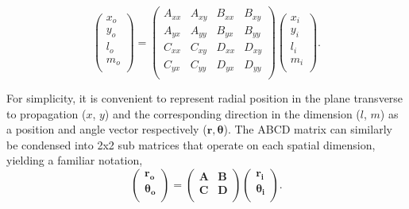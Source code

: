 \begin{equation}
    \begin{pmatrix}
    x_o \\
    y_o \\
    l_o \\
    m_o \\
    \end{pmatrix}
    = 
    \begin{pmatrix}
    A_{xx} & A_{xy} & B_{xx} & B_{xy} \\
    A_{yx} & A_{yy} & B_{yx} & B_{yy} \\
    C_{xx} & C_{xy} & D_{xx} & D_{xy} \\
    C_{yx} & C_{yy} & D_{yx} & D_{yy} \\
    \end{pmatrix}
    \begin{pmatrix}
    x_i \\
    y_i \\
    l_i \\
    m_i \\
    \end{pmatrix}.
    \label{eq:totalabcdmatrix}
\end{equation}

For simplicity, it is convenient to represent  radial position in the plane transverse to propagation ($x$, $y$) and the corresponding direction in the dimension ($l$, $m$) as a position and angle vector respectively ($\mathbf{r}, \boldsymbol{\theta}$). The ABCD matrix can similarly be condensed into 2x2 sub matrices that operate on each spatial dimension, yielding a familiar notation,
\begin{equation}
    \begin{pmatrix}
    \mathbf{r_{o}} \\
    \boldsymbol{\theta_{o}} \\
    \end{pmatrix}
    =
    \begin{pmatrix}
    \mathbf{A} & \mathbf{B} \\
    \mathbf{C} & \mathbf{D} \\
    \end{pmatrix}
    \begin{pmatrix}
    \mathbf{r_{i}} \\
    \boldsymbol{\theta_{i}} \\
    \end{pmatrix}
    \label{eq:matrixabcd}.
\end{equation}

